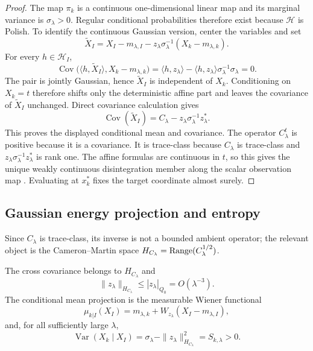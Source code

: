 \begin{proof}
The map $\pi_k$ is a continuous one-dimensional linear map and its marginal
variance is $\sigma_\lambda>0$.  Regular conditional probabilities therefore
exist because $\mathcal{H}$ is Polish.  To identify the continuous Gaussian
version, center the variables and set
\[
  \widetilde X_I
  =X_I-m_{\lambda,I}-z_\lambda\sigma_\lambda^{-1}(X_k-m_{\lambda,k}).
\]
For every $h\in\mathcal{H}_I$,
\[
  \operatorname{Cov}\bigl(\langle h,\widetilde X_I\rangle,
  X_k-m_{\lambda,k}\bigr)
  =\langle h,z_\lambda\rangle
   -\langle h,z_\lambda\rangle\sigma_\lambda^{-1}\sigma_\lambda
  =0.
\]
The pair is jointly Gaussian, hence $\widetilde X_I$ is independent of $X_k$.
Conditioning on $X_k=t$ therefore shifts only the deterministic affine part and
leaves the covariance of $\widetilde X_I$ unchanged.  Direct covariance
calculation gives
\[
  \operatorname{Cov}(\widetilde X_I)
  =C_\lambda-z_\lambda\sigma_\lambda^{-1}z_\lambda^*.
\]
This proves the displayed conditional mean and covariance.  The operator
$C_\lambda^t$ is positive because it is a covariance.  It is trace-class because
$C_\lambda$ is trace-class and $z_\lambda\sigma_\lambda^{-1}z_\lambda^*$ is
rank one.  The affine formulas are continuous in $t$, so this gives the unique
weakly continuous disintegration member along the scalar observation map
\cite{bogachev1998gaussian,lagatta2013continuous,steinwart2024conditioning,chen2024gaussian}.  Evaluating at $x_k^*$ fixes
the target coordinate almost surely.
\end{proof}

\subsection{Gaussian energy projection and entropy}

Since $C_\lambda$ is trace-class, its inverse is not a bounded ambient operator;
the relevant object is the Cameron--Martin space
$H_{C_\lambda}=\operatorname{Range}(C_\lambda^{1/2})$.

\begin{lemma}
\label{lem:conditional_predictor}
The cross covariance belongs to $H_{C_\lambda}$ and
\[
  \|z_\lambda\|_{H_{C_\lambda}}
  \le |z_\lambda|_{Q_0}=O(\lambda^{-3}).
\]
The conditional mean projection is the measurable Wiener functional
\[
  \mu_{k|I}(X_I)
  =
  m_{\lambda,k}
  +W_{z_\lambda}(X_I-m_{\lambda,I}),
\]
and, for all sufficiently large $\lambda$,
\[
  \operatorname{Var}(X_k\mid X_I)
  =
  \sigma_\lambda-\|z_\lambda\|_{H_{C_\lambda}}^2
  =S_{k,\lambda}>0.
\]
\end{lemma}

